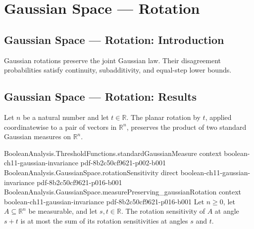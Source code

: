 \section{Gaussian Space --- Rotation}
\subsection*{Gaussian Space --- Rotation: Introduction}
Gaussian rotations preserve the joint Gaussian law. Their disagreement probabilities satisfy continuity, subadditivity, and equal-step lower bounds.

\subsection*{Gaussian Space --- Rotation: Results}

\begin{theorem}
\leanok
{}
Let $n$ be a natural number and let $t\in\mathbb R$. The planar rotation by $t$, applied
coordinatewise to a pair of vectors in $\mathbb R^n$, preserves the product of two
standard Gaussian measures on $\mathbb R^n$.
\end{theorem}

\begin{theorem}
\leanok
{}
\proofstep
  {BooleanAnalysis.ThresholdFunctions.standardGaussianMeasure}
  {context}
  {boolean-ch11-gaussian-invariance}
  {pdf-8b2c50cf9621-p002-b001}
\proofstep
  {BooleanAnalysis.GaussianSpace.rotationSensitivity}
  {direct}
  {boolean-ch11-gaussian-invariance}
  {pdf-8b2c50cf9621-p016-b001}
\proofstep
  {BooleanAnalysis.GaussianSpace.measurePreserving_gaussianRotation}
  {context}
  {boolean-ch11-gaussian-invariance}
  {pdf-8b2c50cf9621-p016-b001}
Let $n\ge 0$, let $A\subseteq\mathbb R^n$ be measurable, and let $s,t\in\mathbb R$. The
rotation sensitivity of $A$ at angle $s+t$ is at most the sum of its rotation
sensitivities at angles $s$ and $t$.
\end{theorem}

